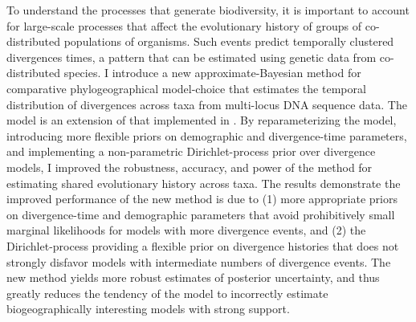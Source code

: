 To understand the processes that generate biodiversity, it is
important to account for large-scale processes that affect the evolutionary
history of groups of co-distributed populations of organisms.
Such events predict temporally clustered divergences times, a pattern
that can be estimated using genetic data from co-distributed species.
I introduce a new approximate-Bayesian method for comparative
phylogeographical model-choice that estimates the temporal distribution of
divergences across taxa from multi-locus DNA sequence data.
The model is an extension of that implemented in \msb.
By reparameterizing the model, introducing more flexible priors on
demographic and divergence-time parameters, and implementing a
non-parametric Dirichlet-process prior over divergence models, I improved
the robustness, accuracy, and power of the method for estimating shared
evolutionary history across taxa.
The results demonstrate the improved performance of the new method is due
to (1) more appropriate priors on divergence-time and demographic
parameters that avoid prohibitively small marginal likelihoods for models
with more divergence events,
and (2) the Dirichlet-process providing a flexible prior on divergence
histories that does not strongly disfavor models with intermediate numbers
of divergence events.
The new method yields more robust estimates of posterior uncertainty, and
thus greatly reduces the tendency of the model to incorrectly estimate
biogeographically interesting models with strong support.

